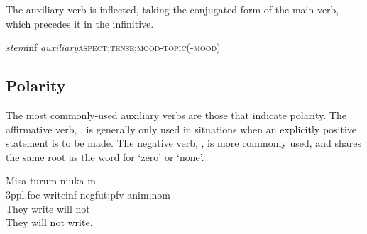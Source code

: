 \documentclass[grammar]{subfiles}
\begin{document}
  The auxiliary verb is inflected, taking the conjugated form of the main verb, which precedes it in the infinitive.

  \begin{exe}
    \ex\label{exe:vm_auxiliary_conjugation} \textit{stem}\bs\acs{inf} \textit{auxiliary}\bs\textsc{aspect;tense;mood-topic(-mood)}
  \end{exe}

  \subsection{Polarity}
  \label{ssec:vm_polarity}

  The most commonly-used auxiliary verbs are those that indicate polarity.  The affirmative verb, , is generally only used in situations when an explicitly positive statement is to be made.  The negative verb, , is more commonly used, and shares the same root as the word for ‘zero’ or ‘none’.

  \begin{exe}
    \ex {}
    \glll Misa turum niuka-m\\
    \acs{3p}\acs{pl}.\acs{foc} write\bs\acs{inf} \acs{neg}\bs\acs{fut};\acs{pfv}-\acs{anim};\acs{nom}\\
    {They} {write} {will not}\\
    \glt They will not write.
  \end{exe}


\end{document}
